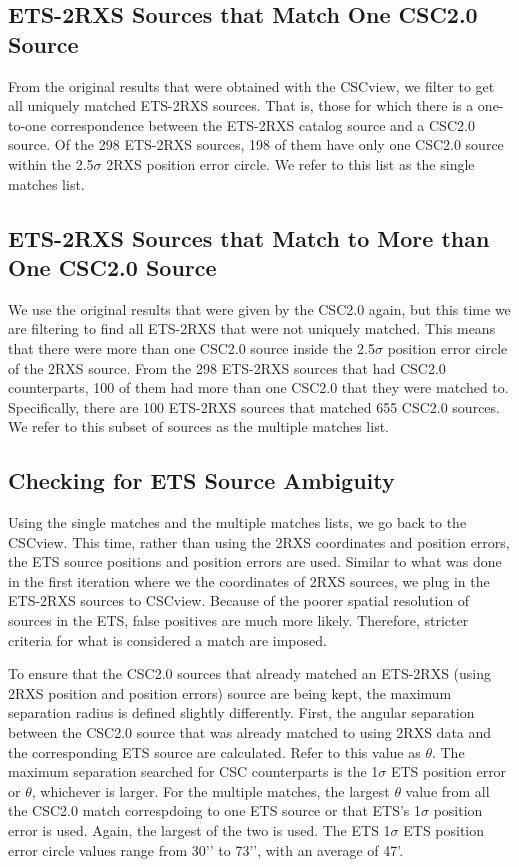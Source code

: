 \subsection{ETS-2RXS Sources that Match One CSC2.0 Source}

From the original results that were obtained with the CSCview, we filter to get all uniquely matched ETS-2RXS sources. That is, those for which there is a one-to-one correspondence between the ETS-2RXS catalog source and a CSC2.0 source. 
Of the 298 ETS-2RXS sources, 198 of them have only one CSC2.0 source within the 2.5$\sigma$ 2RXS position error circle. We refer to this list as the single matches list.


\subsection{ETS-2RXS Sources that Match to More than One CSC2.0 Source}

We use the original results that were given by the CSC2.0 again, but this time we are filtering to find all ETS-2RXS that were not uniquely matched. 
This means that there were more than one CSC2.0 source inside the 2.5$\sigma$ position error circle of the 2RXS source.
From the 298 ETS-2RXS sources that had CSC2.0 counterparts, 100 of them had more than one CSC2.0 that they were matched to.
Specifically, there are 100 ETS-2RXS sources that matched 655 CSC2.0 sources.
We refer to this subset of sources as the multiple matches list.

\subsection{Checking for ETS Source Ambiguity}

Using the single matches and the multiple matches lists, we go back to the CSCview. 
This time, rather than using the 2RXS coordinates and position errors, the ETS source positions and position errors are used. 
Similar to what was done in the first iteration where we the coordinates of 2RXS sources, we plug in the ETS-2RXS sources to CSCview.
Because of the poorer spatial resolution of sources in the ETS, false positives are much more likely.
Therefore, stricter criteria for what is considered a match are imposed. 

To ensure that the CSC2.0 sources that already matched an ETS-2RXS (using 2RXS position and position errors) source are being kept, the maximum separation radius is defined slightly differently. 
First, the angular separation between the CSC2.0 source that was already matched to using 2RXS data and the corresponding ETS source are calculated. 
Refer to this value as $\theta$.
The maximum separation searched for CSC counterparts is the 1$\sigma$ ETS position error or $\theta$, whichever is larger.
For the multiple matches, the largest $\theta$ value from all the CSC2.0 match correspdoing to one ETS source or that ETS's  1$\sigma$ position error is used.
Again, the largest of the two is used.
The ETS 1$\sigma$ ETS position error circle values range from 30’’ to 73’’, with an average of 47’.

